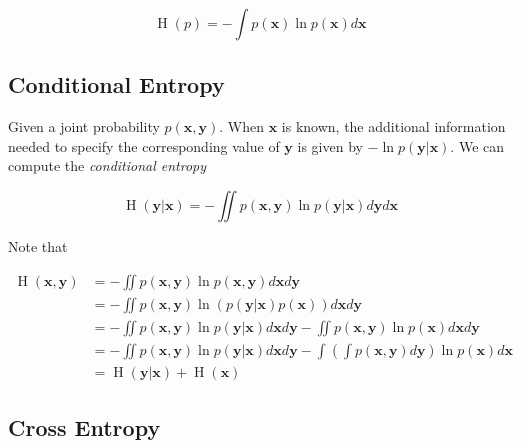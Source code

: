 \documentclass{article}
\begin{document}
            \begin{equation*}
                \operatorname{H}(p) = - \int p(\mathbf{x}) \ln p(\mathbf{x}) d \mathbf{x} 
            \end{equation*}

        \subsection{Conditional Entropy}

            Given a joint probability $ p(\mathbf{x}, \mathbf{y}) $. When $
            \mathbf{x} $ is known, the additional information needed to specify
            the corresponding value of $ \mathbf{y} $ is given by $ - \ln
            p(\mathbf{y} | \mathbf{x}) $. We can compute the \textit{conditional entropy}

            \begin{equation*}
                \operatorname{H}(\mathbf{y} | \mathbf{x}) = 
                 - \iint p(\mathbf{x}, \mathbf{y}) \ln p( \mathbf{y} | \mathbf{x} ) d \mathbf{y} d \mathbf{x}
            \end{equation*}

            Note that

            \begin{align*}
                \operatorname{H}(\mathbf{x}, \mathbf{y})
                      &= - \iint p(\mathbf{x}, \mathbf{y})
                         \ln p(\mathbf{x}, \mathbf{y}) d \mathbf{x} d \mathbf{y} \\
                      &= - \iint p(\mathbf{x}, \mathbf{y}) 
                         \ln ( p(\mathbf{y} | \mathbf{x}) p(\mathbf{x})) d \mathbf{x} d \mathbf{y} \\
                      &= - \iint p(\mathbf{x}, \mathbf{y}) \ln p(\mathbf{y} | \mathbf{x}) d \mathbf{x}
                          d \mathbf{y} - \iint p(\mathbf{x}, \mathbf{y}) \ln p(\mathbf{x}) d \mathbf{x}
                          d \mathbf{y} \\
                      &= - \iint p(\mathbf{x}, \mathbf{y}) \ln p(\mathbf{y} | \mathbf{x}) d \mathbf{x}
                          d \mathbf{y} - \int \left( \int p(\mathbf{x}, \mathbf{y}) d \mathbf{y} \right)
                          \ln p(\mathbf{x}) d \mathbf{x} \\
                      &= \operatorname{H} (\mathbf{y} | \mathbf{x}) + \operatorname{H} (\mathbf{x})
            \end{align*}

        \subsection{Cross Entropy}
\end{document}
